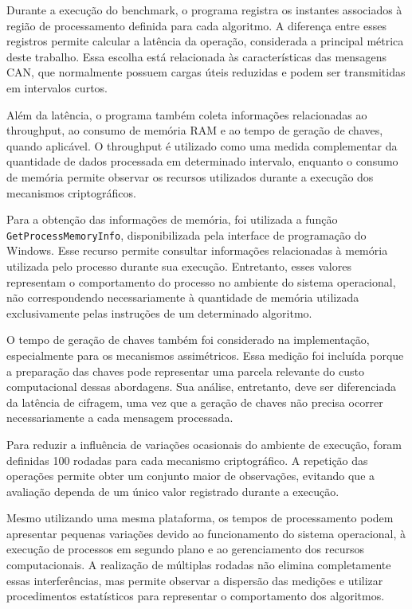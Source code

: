 Durante a execução do benchmark, o programa registra os instantes associados à região de processamento definida para cada algoritmo. A diferença entre esses registros permite calcular a latência da operação, considerada a principal métrica deste trabalho. Essa escolha está relacionada às características das mensagens CAN, que normalmente possuem cargas úteis reduzidas e podem ser transmitidas em intervalos curtos.

Além da latência, o programa também coleta informações relacionadas ao throughput, ao consumo de memória RAM e ao tempo de geração de chaves, quando aplicável. O throughput é utilizado como uma medida complementar da quantidade de dados processada em determinado intervalo, enquanto o consumo de memória permite observar os recursos utilizados durante a execução dos mecanismos criptográficos.

Para a obtenção das informações de memória, foi utilizada a função \texttt{GetProcessMemoryInfo}, disponibilizada pela interface de programação do Windows. Esse recurso permite consultar informações relacionadas à memória utilizada pelo processo durante sua execução. Entretanto, esses valores representam o comportamento do processo no ambiente do sistema operacional, não correspondendo necessariamente à quantidade de memória utilizada exclusivamente pelas instruções de um determinado algoritmo.

O tempo de geração de chaves também foi considerado na implementação, especialmente para os mecanismos assimétricos. Essa medição foi incluída porque a preparação das chaves pode representar uma parcela relevante do custo computacional dessas abordagens. Sua análise, entretanto, deve ser diferenciada da latência de cifragem, uma vez que a geração de chaves não precisa ocorrer necessariamente a cada mensagem processada.

Para reduzir a influência de variações ocasionais do ambiente de execução, foram definidas 100 rodadas para cada mecanismo criptográfico. A repetição das operações permite obter um conjunto maior de observações, evitando que a avaliação dependa de um único valor registrado durante a execução.

Mesmo utilizando uma mesma plataforma, os tempos de processamento podem apresentar pequenas variações devido ao funcionamento do sistema operacional, à execução de processos em segundo plano e ao gerenciamento dos recursos computacionais. A realização de múltiplas rodadas não elimina completamente essas interferências, mas permite observar a dispersão das medições e utilizar procedimentos estatísticos para representar o comportamento dos algoritmos.

